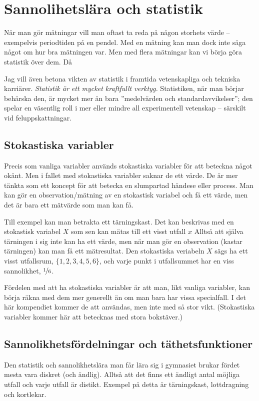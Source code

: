 \documentclass[11pt,a4paper, english, swedish
]{article}
\begin{document}

\setcounter{page}{1}




\section{Sannolihetslära och statistik}\label{sec:statistik}
När man gör mätningar vill man oftast ta reda på någon storhets värde
-- exempelvis periodtiden på en pendel. Med en mätning kan man dock
inte säga något om hur bra mätningen var. Men med flera mätningar kan
vi börja göra statistik över dem. Då 

Jag vill även betona vikten av statistik i framtida vetenskapliga och
tekniska karriärer. \emph{Statistik är ett mycket kraftfullt verktyg.}
Statistiken, när man börjar behärska den, är mycket mer än bara
''medelvärden och standardavvikelser''; den spelar en väsentlig roll i
mer eller mindre all experimentell vetenskap -- särskilt vid
feluppskattningar. 

\subsection{Stokastiska variabler}
Precis som vanliga variabler används stokastiska variabler för att
beteckna något okänt. Men i fallet med stokastiska variabler saknar de
ett värde. De är mer tänkta som ett koncept för att betecka en
slumpartad händese eller process. Man kan gör en observation/mätning
av en stokastisk variabel och få ett värde, men det är bara ett
mätvärde som man kan få. 

Till exempel kan man betrakta ett tärningskast. Det kan beskrivas med
en stokastisk variabel $X$ som sen kan mätas till ett visst utfall $x$
Alltså att själva tärningen i sig inte kan ha ett värde, men när man
gör en observation (kastar tärningen) kan man få ett mätresultat. Den
stokastiska veriabeln $X$ sägs ha ett visst utfallsrum, 
$\{1, 2, 3, 4, 5, 6\}$, och varje punkt i utfallsummet har en viss
sannolikhet, $\nicefrac{1}{6}$.

Fördelen med att ha stokastiska variabler är att man, likt vanliga
variabler, kan börja räkna med dem mer generellt än om man bara har
vissa specialfall. I det här kompendiet kommer de att användas, men
inte med så stor vikt. (Stokastiska variabler kommer här att betecknas
med stora bokstäver.)

\subsection{Sannolikhetsfördelningar och täthetsfunktioner}
Den statistik och sannolikhetslära man får lära sig i gymnasiet brukar
fördet mesta vara diskret (och ändlig). Alltså att det finns ett
ändligt antal möjliga utfall och varje utfall är distikt. Exempel på
detta är tärningskast, lottdragning och kortlekar. 
\end{document}
